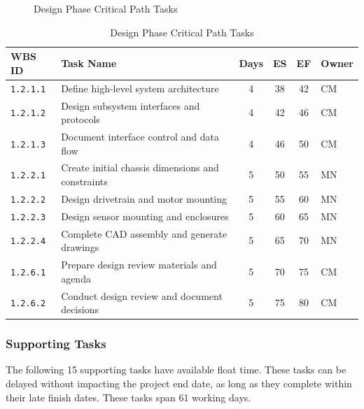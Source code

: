 \begin{figure}[H]
{\begin{tikzpicture}
\end{tikzpicture}
}%
\caption{Design Phase Critical Path Tasks}
\label{fig:nld_design_critical}
\end{figure}

\begin{table}[H]
\centering
\small
{}
\begin{tabular}{|l|p{5cm}|c|c|c|l|}
\hline
\rowcolor{designyellow!40}
\textbf{WBS ID} & \textbf{Task Name} & \textbf{Days} & \textbf{ES} & \textbf{EF} & \textbf{Owner} \\
\hline
\texttt{1.2.1.1} & Define high-level system architecture & 4 & 38 & 42 & CM \\
\hline
\texttt{1.2.1.2} & Design subsystem interfaces and protocols & 4 & 42 & 46 & CM \\
\hline
\texttt{1.2.1.3} & Document interface control and data flow & 4 & 46 & 50 & CM \\
\hline
\texttt{1.2.2.1} & Create initial chassis dimensions and constraints & 5 & 50 & 55 & MN \\
\hline
\texttt{1.2.2.2} & Design drivetrain and motor mounting & 5 & 55 & 60 & MN \\
\hline
\texttt{1.2.2.3} & Design sensor mounting and enclosures & 5 & 60 & 65 & MN \\
\hline
\texttt{1.2.2.4} & Complete CAD assembly and generate drawings & 5 & 65 & 70 & MN \\
\hline
\texttt{1.2.6.1} & Prepare design review materials and agenda & 5 & 70 & 75 & CM \\
\hline
\texttt{1.2.6.2} & Conduct design review and document decisions & 5 & 75 & 80 & CM \\
\hline
\end{tabular}
\caption{Design Phase Critical Path Tasks}
\label{tab:nld_design_critical}
\end{table}

\subsubsection{Supporting Tasks}

\noindent The following 15 supporting tasks have available float time. 
These tasks can be delayed without impacting the project end date, as long as they complete within their late finish dates. 
These tasks span 61 working days.

\vspace{0.5em}

